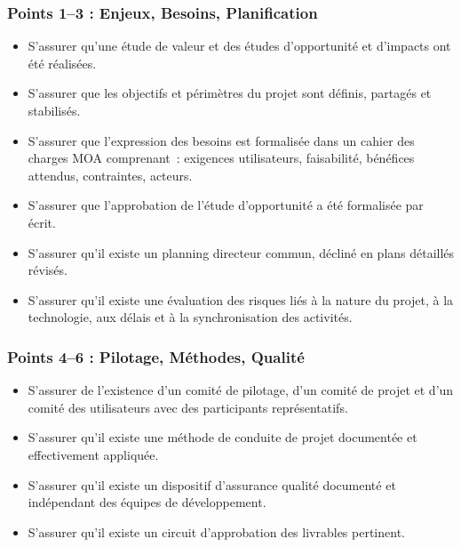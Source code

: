 \subsubsection{Points 1--3 : Enjeux, Besoins, Planification}
\begin{itemize}
    \item S'assurer qu'une étude de valeur et des études d'opportunité et d'impacts ont été réalisées.
    \item S'assurer que les objectifs et périmètres du projet sont définis, partagés et stabilisés.
    \item S'assurer que l'expression des besoins est formalisée dans un cahier des charges MOA comprenant~: exigences utilisateurs, faisabilité, bénéfices attendus, contraintes, acteurs.
    \item S'assurer que l'approbation de l'étude d'opportunité a été formalisée par écrit.
    \item S'assurer qu'il existe un planning directeur commun, décliné en plans détaillés révisés.
    \item S'assurer qu'il existe une évaluation des risques liés à la nature du projet, à la technologie, aux délais et à la synchronisation des activités.
\end{itemize}

\subsubsection{Points 4--6 : Pilotage, Méthodes, Qualité}
\begin{itemize}
    \item S'assurer de l'existence d'un comité de pilotage, d'un comité de projet et d'un comité des utilisateurs avec des participants représentatifs.
    \item S'assurer qu'il existe une méthode de conduite de projet documentée et effectivement appliquée.
    \item S'assurer qu'il existe un dispositif d'assurance qualité documenté et indépendant des équipes de développement.
    \item S'assurer qu'il existe un circuit d'approbation des livrables pertinent.
\end{itemize}

